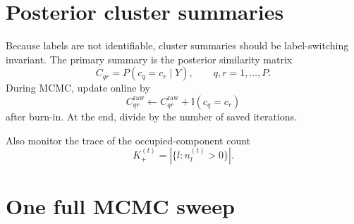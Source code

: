 \documentclass[11pt]{article}
\newcommand{\ind}{\mathbb I}
\begin{document}
\section{Posterior cluster summaries}

Because labels are not identifiable, cluster summaries should be
label-switching invariant.  The primary summary is the posterior similarity
matrix
\begin{equation}
    C_{qr}
    =
    P(c_q=c_r\mid Y),
    \qquad q,r=1,\dots,P.
\end{equation}
During MCMC, update online by
\begin{equation}
    C_{qr}^{\mathrm{raw}}
    \leftarrow
    C_{qr}^{\mathrm{raw}}+\ind(c_q=c_r)
\end{equation}
after burn-in.  At the end, divide by the number of saved iterations.

Also monitor the trace of the occupied-component count
\begin{equation}
    K_+^{(t)}=|\{l:n_l^{(t)}>0\}|.
\end{equation}


\section{One full MCMC sweep}
\end{document}
